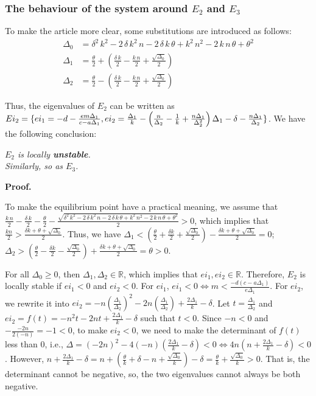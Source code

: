 \documentclass{article}
\begin{document}
\subsubsection{The behaviour of the system around $E_{2}$ and $E_{3}$}
\par To make the article more clear, some substitutions are introduced as follows:\\
\begin{align*}
    \Delta_{0}&=\delta ^2\,k^2-2\,\delta \,k^2\,n-2\,\delta \,k\,\theta +k^2\,n^2-2\,k\,n\,\theta +\theta ^2\\
    \Delta_{1}&=\frac{\theta }{2}+\left(\frac{\delta \,k}{2}-\frac{k\,n}{2}+\frac{\sqrt{\Delta_{0}}}{2}\right)\\
    \Delta_{2}&=\frac{\theta }{2}-\left(\frac{\delta \,k}{2}-\frac{k\,n}{2}+\frac{\sqrt{\Delta_{0}}}{2}\right)
\end{align*}
\par Thus, the eigenvalues of $E_{2}$ can be written as 
$
Ei_{2}=\{ei_{1}=-d-\frac{em\Delta_{1}}{c-a\Delta_{1}},\\
ei_{2}=\frac{\Delta_{1}}{k}-\left(\frac{n}{\Delta_{2}}-\frac{1}{k}+\frac{n\Delta_{1}}{\Delta_{2}^{2}}\right)\Delta_{1}-\delta-\frac{n\Delta_{1}}{\Delta_{2}}\}
$.
We have the following conclusion:
\begin{center}
    \textit{$E_{2}$ is locally \textbf{unstable}.\\ Similarly, so as $E_{3}$.}
\end{center}
\textbf{Proof.}\\
\par To make the equilibrium point have a practical meaning, we assume that $\frac{k\,n}{2}-\frac{\delta \,k}{2}-\frac{\theta }{2}-\frac{\sqrt{\delta ^2\,k^2-2\,\delta \,k^2\,n-2\,\delta \,k\,\theta +k^2\,n^2-2\,k\,n\,\theta +\theta ^2}}{2}>0$, which implies that $\frac{kn}{2}>\frac{\delta k+\theta+\sqrt{\Delta_{0}}}{2}$. Thus, we have $\Delta_{1}<\left(\frac{\theta}{2}+\frac{\delta k}{2}+\frac{\sqrt{\Delta_{0}}}{2}\right)-\frac{\delta k+\theta+\sqrt{\Delta_{0}}}{2}=0$; $\Delta_{2}>\left(\frac{\theta}{2}-\frac{\delta k}{2}-\frac{\sqrt{\Delta_{0}}}{2}\right)+\frac{\delta k+\theta+\sqrt{\Delta_{0}}}{2}=\theta>0$.
\par For all $\Delta_{0} \geq 0$, then $\Delta_{1}, \Delta_{2}\in \mathbb{R}$, which implies that $ei_{1},ei_{2}\in \mathbb{R}$. Therefore, $E_{2}$ is locally stable if $ei_{1}<0$ and $ei_{2}<0$. For $ei_{1}$, $ei_{1}<0\Leftrightarrow m<\frac{-d(c-a\Delta_{1})}{e\Delta_{1}}$. For $ei_{2}$, we rewrite it into $ei_{2}=-n\left(\frac{\Delta_{1}}{\Delta_{2}}\right)^2-2n\left(\frac{\Delta_{1}}{\Delta_{2}}\right)+\frac{2\Delta_{1}}{k}-\delta$. Let $t=\frac{\Delta_{1}}{\Delta_{2}}$ and $ei_{2}=f(t)=-n^{2}t-2nt+\frac{2\Delta_{1}}{k}-\delta$ such that $t<0$. Since $-n<0$ and $-\frac{-2n}{2(-n)}=-1<0$, to make $ei_{2}<0$, we need to make the determinant of $f(t)$ less than 0, i.e., $\Delta=(-2n)^{2}-4(-n)(\frac{2\Delta_{1}}{k}-\delta)<0 \Leftrightarrow 4n(n+\frac{2\Delta_{1}}{k}-\delta)<0$. However, $n+\frac{2\Delta_{1}}{k}-\delta = n+(\frac{\theta}{k}+\delta-n+\frac{\sqrt{\Delta_{0}}}{k})-\delta = \frac{\theta}{k}+\frac{\sqrt{\Delta_{0}}}{k} > 0$. That is, the determinant cannot be negative, so, the two eigenvalues cannot always be both negative.
\end{document}
